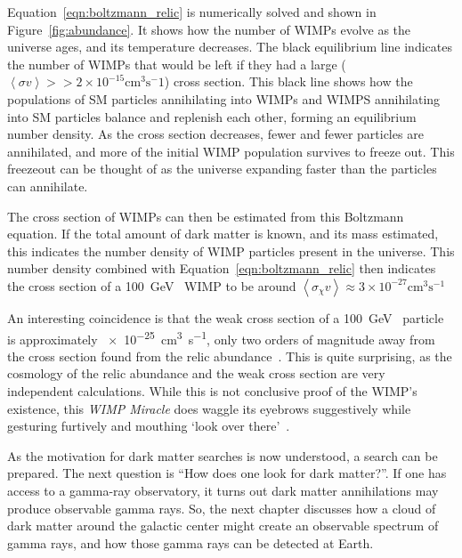 Equation~\ref{eqn:boltzmann_relic} is numerically solved and shown in Figure~\ref{fig:abundance}.
It shows how the number of WIMPs evolve as the universe ages, and its temperature decreases.
The black equilibrium line indicates the number of WIMPs that would be left if they had a large ($\left \langle \sigma v \right \rangle >> 2 \times 10^{-15} \textrm{cm}^3 \textrm{s}^-1$) cross section.
This black line shows how the populations of SM particles annihilating into WIMPs and WIMPS annihilating into SM particles balance and replenish each other, forming an equilibrium number density.
As the cross section decreases, fewer and fewer particles are annihilated, and more of the initial WIMP population survives to freeze out.
This freezeout can be thought of as the universe expanding faster than the particles can annihilate.

The cross section of WIMPs can then be estimated from this Boltzmann equation.
If the total amount of dark matter is known, and its mass estimated, this indicates the number density of WIMP particles present in the universe.
This number density combined with Equation~\ref{eqn:boltzmann_relic} then indicates the cross section of a \SI{100}{\GeV{}} WIMP to be around $\left \langle \sigma_{\chi} v \right \rangle \approx 3 \times 10^{-27} \textrm{cm}^{3}\textrm{s}^{-1}$

An interesting coincidence is that the weak cross section of a \SI{100}{\GeV{}} particle is approximately \SI{e-25}{cm^3s^{-1}}, only two orders of magnitude away from the cross section found from the relic abundance~\cite{Jungman:1995df}.
This is quite surprising, as the cosmology of the relic abundance and the weak cross section are very independent calculations.
While this is not conclusive proof of the WIMP's existence, this \textit{WIMP Miracle} does waggle its eyebrows suggestively while gesturing furtively and mouthing `look over there'~\cite{xkcd_causation}.

As the motivation for dark matter searches is now understood, a search can be prepared.
The next question is ``How does one look for dark matter?''.
If one has access to a gamma-ray observatory, it turns out dark matter annihilations may produce observable gamma rays.
So, the next chapter discusses how a cloud of dark matter around the galactic center might create an observable spectrum of gamma rays, and how those gamma rays can be detected at Earth.











